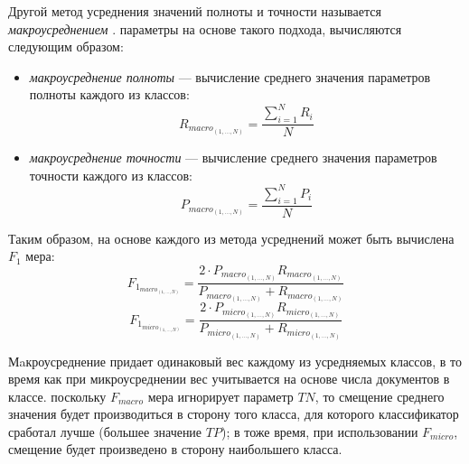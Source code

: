 
    Другой метод усреднения значений полноты и точности называется {\it макроусреднением} \cite{micromacromeasures}.
    параметры на основе такого подхода, вычисляются следующим образом:
    \begin{itemize}
        \item {\it макроусреднение полноты} --- вычисление среднего значения параметров
            полноты каждого из классов:
            \begin{equation}
                R_{macro_{(1, \ldots, N)}} = \dfrac{\sum\limits_{i=1}^N R_i}{N}
            \end{equation}
        \item {\it макроусреднение точности} --- вычисление среднего значения параметров
            точности каждого из классов:
            \begin{equation}
                P_{macro_{(1, \ldots, N)}} = \dfrac{\sum\limits_{i=1}^N P_i}{N}
            \end{equation}
    \end{itemize}

    Таким образом, на основе каждого из метода усреднений может быть вычислена
    $F_1$ мера:
    \begin{equation}
        \label{eq:fmacro12}
        F_{1_{macro_{(1, \ldots, N)}}} = \dfrac{2 \cdot P_{macro_{(1,\ldots, N)}} R_{macro_{(1,\ldots, N)}} }{P_{macro_{(1,\ldots, N)}} + R_{macro_{(1,\ldots, N)}}}
    \end{equation}
    \begin{equation}
        \label{eq:fmicro12}
        F_{1_{micro_{(1, \ldots, N)}}} = \dfrac{2 \cdot P_{micro_{(1,\ldots, N)}} R_{micro_{(1,\ldots, N)}} }{P_{micro_{(1,\ldots, N)}} + R_{micro_{(1,\ldots, N)}}}
    \end{equation}


    Мaкроусреднение придает одинаковый вес каждому из усредняемых классов, в то
    время как при микроусреднении вес учитывается на основе числа документов в
    классе. поскольку $F_{macro}$ мера игнорирует параметр $TN$, то смещение
    среднего значения будет производиться в сторону того класса, для которого классификатор сработал
    лучше (большее значение $TP$); в тоже время, при использовании $F_{micro}$,
    смещение будет произведено в сторону наибольшего класса. \cite{micromacromeasures}

